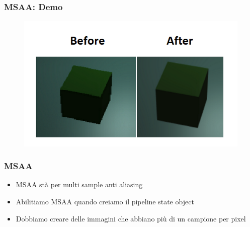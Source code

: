 \begin{frame}
\frametitle{MSAA: Demo}
\begin{figure}[ht]
    \centering
    \includegraphics[scale=0.50]{images/SlidesMSAA/BeforeAfterMSAA.png}
\end{figure}
\end{frame}

\begin{frame}
\frametitle{MSAA}
\begin{itemize}
\item MSAA stà per multi sample anti aliasing
\item Abilitiamo MSAA quando creiamo il pipeline state object
\item Dobbiamo creare delle immagini che abbiano più di un campione per pixel
\end{itemize}
\end{frame}
